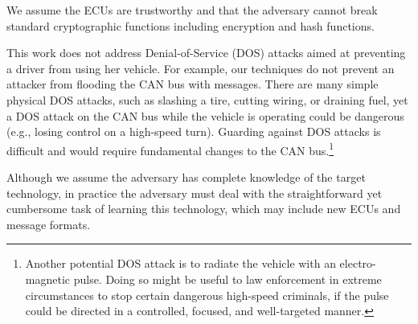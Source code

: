 We assume the ECUs are trustworthy and that the adversary cannot break standard cryptographic functions 
including encryption and hash functions.

This work does not address Denial-of-Service (DOS) attacks aimed at preventing a driver from using her vehicle.  
For example, our techniques do not prevent an attacker from flooding the CAN bus with messages.  There are many
simple physical DOS attacks, such as slashing a tire, cutting wiring, or draining fuel, yet
a DOS attack on the CAN bus while the vehicle is operating could be dangerous 
(e.g., losing control on a high-speed turn).  Guarding against DOS attacks is difficult and would require fundamental
changes to the CAN bus.\footnote{Another potential DOS attack is to radiate the vehicle with an electro-magnetic pulse.
Doing so might be useful to law enforcement in extreme circumstances to stop certain dangerous high-speed criminals, 
if the pulse could be directed in a controlled, focused, and well-targeted manner.}

Although we assume the adversary has complete knowledge of the target technology, in practice the adversary must
deal with the straightforward yet cumbersome task of learning this technology, which may include new ECUs and message formats.


